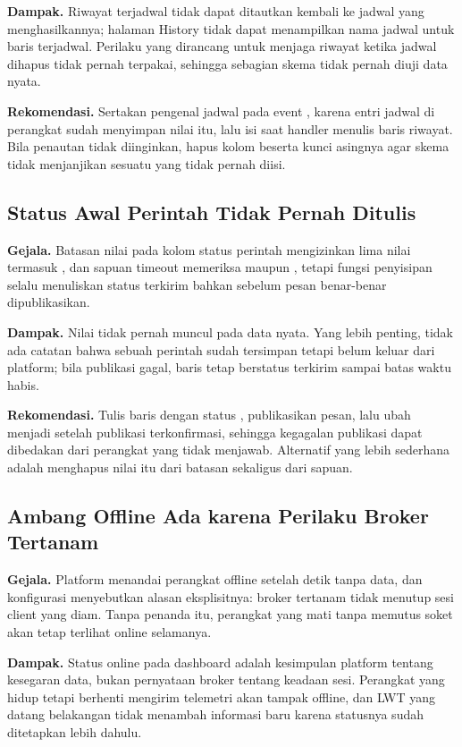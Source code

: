 \textbf{Dampak.} Riwayat terjadwal tidak dapat ditautkan kembali ke jadwal yang
menghasilkannya; halaman History tidak dapat menampilkan nama jadwal untuk baris
terjadwal. Perilaku  yang dirancang untuk menjaga riwayat ketika
jadwal dihapus tidak pernah terpakai, sehingga sebagian skema tidak pernah diuji
data nyata.

\textbf{Rekomendasi.} Sertakan pengenal jadwal pada event ,
karena entri jadwal di perangkat sudah menyimpan nilai itu, lalu isi
 saat handler menulis baris riwayat. Bila penautan tidak
diinginkan, hapus kolom beserta kunci asingnya agar skema tidak menjanjikan sesuatu
yang tidak pernah diisi.

\subsection{Status Awal Perintah Tidak Pernah Ditulis}

\textbf{Gejala.} Batasan nilai pada kolom status perintah mengizinkan lima nilai
termasuk , dan sapuan timeout memeriksa  maupun
, tetapi fungsi penyisipan selalu menuliskan status terkirim bahkan
sebelum pesan benar-benar dipublikasikan.

\textbf{Dampak.} Nilai  tidak pernah muncul pada data nyata. Yang lebih
penting, tidak ada catatan bahwa sebuah perintah sudah tersimpan tetapi belum keluar
dari platform; bila publikasi gagal, baris tetap berstatus terkirim sampai batas
waktu habis.

\textbf{Rekomendasi.} Tulis baris dengan status , publikasikan pesan,
lalu ubah menjadi  setelah publikasi terkonfirmasi, sehingga kegagalan
publikasi dapat dibedakan dari perangkat yang tidak menjawab. Alternatif yang lebih
sederhana adalah menghapus nilai itu dari batasan sekaligus dari sapuan.

\subsection{Ambang Offline Ada karena Perilaku Broker Tertanam}

\textbf{Gejala.} Platform menandai perangkat offline setelah \OfflineS{} detik tanpa
data, dan konfigurasi menyebutkan alasan eksplisitnya: broker tertanam tidak menutup
sesi client yang diam. Tanpa penanda itu, perangkat yang mati tanpa memutus soket
akan tetap terlihat online selamanya.

\textbf{Dampak.} Status online pada dashboard adalah kesimpulan platform tentang
kesegaran data, bukan pernyataan broker tentang keadaan sesi. Perangkat yang hidup
tetapi berhenti mengirim telemetri akan tampak offline, dan LWT yang datang
belakangan tidak menambah informasi baru karena statusnya sudah ditetapkan lebih
dahulu.

